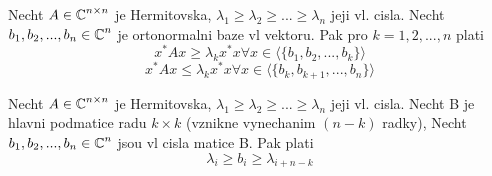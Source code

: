 \begin{theorem}
	Necht $A \in \operatorname{\mathbb{C}}^{n \times n}$ je Hermitovska, $\lambda_1 \geq \lambda_2 \geq ... \geq \lambda_n$ jeji vl. cisla.
	Necht $b_1, b_2, ..., b_n \in \operatorname{\mathbb{C}}^n$ je ortonormalni baze vl vektoru. Pak pro $k = 1, 2, ..., n$ plati
	\[ x^{\ast}Ax \geq \lambda_k x^{\ast}x \forall x \in \langle \{ b_1, b_2, ..., b_k\} \rangle \]
	\[ x^{\ast}Ax \leq \lambda_k x^{\ast}x \forall x \in \langle \{ b_k, b_{k+1}, ..., b_n\} \rangle \]
\end{theorem}

\begin{theorem}
	Necht $A \in \operatorname{\mathbb{C}}^{n \times n}$ je Hermitovska, $\lambda_1 \geq \lambda_2 \geq ... \geq \lambda_n$ jeji vl. cisla.
	Necht B je hlavni podmatice radu $k \times k$ (vznikne vynechanim $(n - k)$ radky),
	Necht $b_1, b_2, ..., b_n \in \operatorname{\mathbb{C}}^n$ jsou vl cisla matice B. Pak plati
	\[ \lambda_i \geq b_i \geq \lambda_{i + n - k} \]
\end{theorem}
